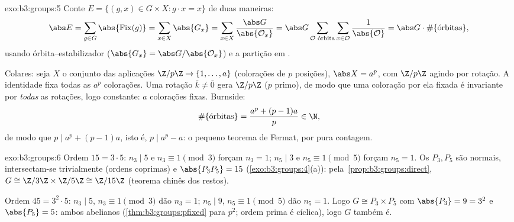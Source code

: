 \begin{solution}{exo:b3:groups:5}
Conte $E = \{(g,x) \in G \times X : g \cdot x = x\}$ de duas maneiras:
\[
\abs E = \sum_{g \in G} \abs{\operatorname{Fix}(g)}
= \sum_{x \in X} \abs{G_x}
= \sum_{x \in X} \frac{\abs G}{\abs{\mathcal O_x}}
= \abs G \sum_{\mathcal O \text{ órbita}} \sum_{x \in \mathcal O}
\frac{1}{\abs{\mathcal O}}
= \abs G \cdot \#\{\text{órbitas}\},
\]
usando órbita--estabilizador ($\abs{G_x} = \abs G/\abs{\mathcal O_x}$) e a partição em .

Colares: seja $X$ o conjunto das aplicações $\Z/p\Z \to
\{1, \dots, a\}$ (colorações de
$p$ posições), $\abs X = a^p$, com $\Z/p\Z$ agindo por rotação. A
identidade fixa todas as $a^p$ colorações. Uma rotação $\bar k \neq \bar 0$ gera
$\Z/p\Z$ ($p$ primo), de modo que uma coloração por ela fixada é
invariante por \emph{todas} as rotações, logo constante: $a$
colorações fixas. Burnside:
\[
\#\{\text{órbitas}\} = \frac{a^p + (p-1)a}{p} \in \N ,
\]
de modo que $p \mid a^p + (p-1)a$, isto é, $p \mid a^p - a$: o pequeno teorema de Fermat, por pura
contagem.
\end{solution}

\begin{solution}{exo:b3:groups:6}
Ordem $15 = 3 \cdot 5$: $n_3 \mid 5$ e $n_3 \equiv 1 \pmod 3$ forçam $n_3 = 1$; $n_5 \mid 3$ e $n_5 \equiv 1 \pmod 5$ forçam $n_5 = 1$. Os
 $P_3, P_5$ são normais, intersectam-se trivialmente
(ordens coprimas) e $\abs{P_3P_5} = 15$ (\cref{exo:b3:groups:4}(a)): pela~\cref{prop:b3:groups:direct},
$G
\cong \Z/3\Z \times \Z/5\Z \cong \Z/15\Z$ (teorema chinês dos restos).

Ordem $45 = 3^2 \cdot 5$: $n_3 \mid 5$, $n_3 \equiv 1 \pmod 3$ dão $n_3 = 1$; $n_5 \mid 9$, $n_5 \equiv 1 \pmod 5$ dão $n_5 =
1$. Logo $G \cong P_3 \times P_5$
com $\abs{P_3} = 9 = 3^2$ e $\abs{P_5} = 5$: ambos abelianos (\cref{thm:b3:groups:pfixed} para $p^2$; ordem
prima é cíclica), logo $G$ também é.
\end{solution}

